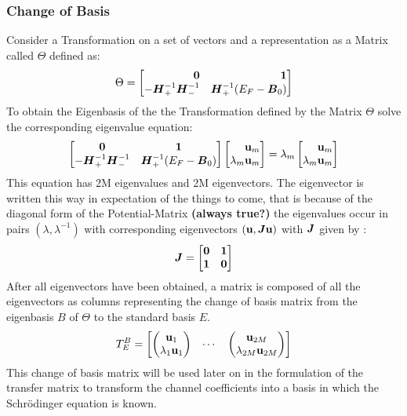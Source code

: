\subsubsection{Change of Basis}
Consider a Transformation on a set of vectors and a representation as a Matrix called $\Theta$ defined as:
\begin{equation}
  \Theta = 
  \begin{bmatrix*}[r]
    \mabol{0} & \mabol{1} \\
    -\mabol{H}_{+}^{-1}\mabol{H}_{-}^{-1} & \mabol{H}_{+}^{-1}(E_{F}-\mabol{B}_{0})
  \end{bmatrix*}
  \label{Theta}
\end{equation}
To obtain the Eigenbasis of the the Transformation defined by the Matrix $\Theta$ solve the corresponding eigenvalue equation:
 \begin{equation}
  \begin{bmatrix}
    \mabol{0} & \mabol{1} \\
    -\mabol{H}_{+}^{-1}\mabol{H}_{-}^{-1} & \mabol{H}_{+}^{-1}(E_{F}-\mabol{B}_{0})
  \end{bmatrix}
  \begin{bmatrix*}[r]
    \v{u}_m \\
    \lambda_m \v{u}_m
  \end{bmatrix*}
  = \lambda_m
  \begin{bmatrix*}[r]
    \v{u}_m \\
    \lambda_m \v{u}_m
  \end{bmatrix*}
  \label{Eigenvalueeqn}
\end{equation}
This equation has 2M eigenvalues and 2M eigenvectors. The eigenvector is written this way in expectation of the things to come, that is because of the diagonal form of the Potential-Matrix \textbf{(always true?)} the eigenvalues occur in pairs $(\lambda, \lambda^{-1})$ with corresponding eigenvectors $(\mathbf{u}, \boldsymbol{J}\mathbf{u})$ with  $\boldsymbol{J}$ given by \cite{MacKinnon2003}:
\begin{equation}
  \mabol{J} = 
  \begin{bmatrix*}
    \mabol{0} & \mabol{1} \\
    \mabol{1} & \mabol{0}
  \end{bmatrix*}
  \label{J}
\end{equation}
After all eigenvectors have been obtained, a matrix is composed of all the eigenvectors as columns representing the change of basis matrix from the eigenbasis $B$ of $\Theta$ to the standard basis $E$.
\begin{equation}
  T^{B}_{E}=
  \begin{bmatrix}
    \begin{pmatrix}
      \mathbf{u}_{1} \\
      \lambda_{1} \mathbf{u}_{1}
    \end{pmatrix}
    &
    \cdots
    &
    \begin{pmatrix}
      \mathbf{u}_{2M} \\
      \lambda_{2M} \mathbf{u}_{2M}
    \end{pmatrix}
  \end{bmatrix}
  \label{EigenBaseTheta}
\end{equation}
This change of basis matrix will be used later on in the formulation of the transfer matrix to transform the channel coefficients into a basis in which the Schr\"odinger equation is known.
